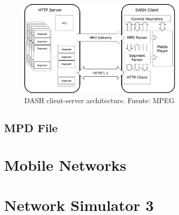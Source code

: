 \begin{figure}[h]
  \centering
  \includegraphics[width=0.7\textwidth]{img/dasharch.png}
  \caption{DASH client-server architecture. Fuente: MPEG \cite{ios1}}
  \label{fig:dasharch}
\end{figure}

\subsection{MPD File}
\label{sec:mpd}

\section{Mobile Networks}
\label{sec:mobile}




\section{Network Simulator 3}
\label{sec:ns3}

